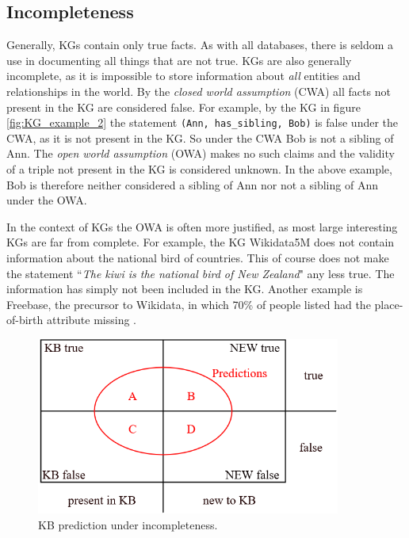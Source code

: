 \subsection{Incompleteness}
\label{Integrity_of_KGs}
Generally, KGs contain only true facts. As with all databases, there is seldom a use in documenting all things that are not true. KGs are also generally incomplete, as it is impossible to store information about \textit{all} entities and relationships in the world. By the \textit{closed world assumption} (CWA) all facts not present in the KG are considered false. For example, by the KG in figure \ref{fig:KG_example_2} the statement \texttt{(Ann, has\_sibling, Bob)} is false under the CWA, as it is not present in the KG. So under the CWA Bob is not a sibling of Ann. The \textit{open world assumption} (OWA) makes no such claims and  the validity of a triple not present in the KG is considered unknown. In the above example, Bob is therefore neither considered a sibling of Ann nor not a sibling of Ann under the OWA.

In the context of KGs the OWA is often more justified, as most large interesting KGs are far from complete. For example, the KG Wikidata5M does not contain information about the national bird of countries. This of course does not make the statement ``\textit{The kiwi is the national bird of New Zealand}" any less true. The information has simply not been included in the KG. Another example is Freebase, the precursor to Wikidata, in which 70\% of people listed had the place-of-birth attribute missing \cite{west2014knowledge}.

\begin{figure}[htp]
    \centering
    \includegraphics[width=10cm]{figures/kb_venn.png}
    \caption{KB prediction under incompleteness.}
    \label{KB_predictions}
\end{figure}

